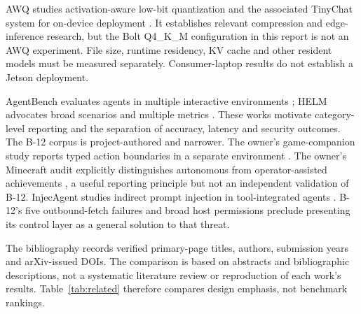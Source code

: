 \documentclass[11pt]{article}
\begin{document}
AWQ studies activation-aware low-bit quantization and the associated TinyChat system for on-device deployment \cite{awq}. It establishes relevant compression and edge-inference research, but the Bolt Q4\_K\_M configuration in this report is not an AWQ experiment. File size, runtime residency, KV cache and other resident models must be measured separately. Consumer-laptop results do not establish a Jetson deployment.

AgentBench evaluates agents in multiple interactive environments \cite{agentbench}; HELM advocates broad scenarios and multiple metrics \cite{helm}. These works motivate category-level reporting and the separation of accuracy, latency and security outcomes. The B-12 corpus is project-authored and narrower. The owner's game-companion study reports typed action boundaries in a separate environment \cite{wow}. The owner's Minecraft audit explicitly distinguishes autonomous from operator-assisted achievements \cite{minecraft}, a useful reporting principle but not an independent validation of B-12. InjecAgent studies indirect prompt injection in tool-integrated agents \cite{injec}. B-12's five outbound-fetch failures and broad host permissions preclude presenting its control layer as a general solution to that threat.

The bibliography records verified primary-page titles, authors, submission years and arXiv-issued DOIs. The comparison is based on abstracts and bibliographic descriptions, not a systematic literature review or reproduction of each work's results. Table~\ref{tab:related} therefore compares design emphasis, not benchmark rankings.
\end{document}
